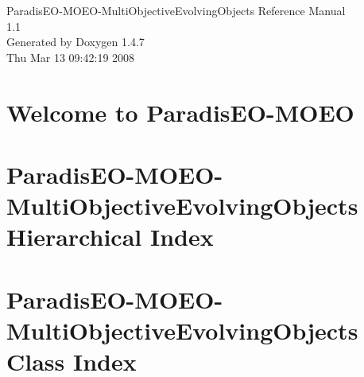 \documentclass[a4paper]{book}
\begin{document}
\begin{titlepage}
\vspace*{7cm}
\begin{center}
{\Large Paradis\-EO-MOEO-Multi\-Objective\-Evolving\-Objects Reference Manual\\[1ex]\large 1.1 }\\
\vspace*{1cm}
{\large Generated by Doxygen 1.4.7}\\
\vspace*{0.5cm}
{\small Thu Mar 13 09:42:19 2008}\\
\end{center}
\end{titlepage}
\clearemptydoublepage
{}
\tableofcontents
\clearemptydoublepage
{}
\chapter{Welcome to Paradis\-EO-MOEO }
\label{index}
\chapter{Paradis\-EO-MOEO-Multi\-Objective\-Evolving\-Objects Hierarchical Index}

\chapter{Paradis\-EO-MOEO-Multi\-Objective\-Evolving\-Objects Class Index}

\end{document}
